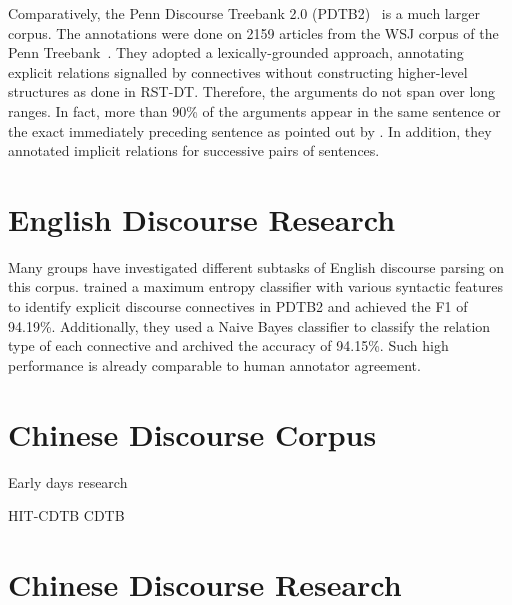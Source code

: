 

Comparatively, the Penn Discourse Treebank 2.0 (PDTB2)~\citep{Prasad08thepenn}
is a much larger corpus. The annotations were done on 2159 articles from
the WSJ corpus of the Penn Treebank~\citep{marcus1993building}. They adopted a lexically-grounded
approach, annotating explicit relations signalled by connectives without constructing higher-level
structures as done in RST-DT. Therefore, the arguments do not span over long ranges. In fact,
more than 90\% of the arguments appear in the same sentence or the exact immediately
preceding sentence as pointed out by \cite{kong2014a}. In addition, they annotated implicit relations
for successive pairs of sentences.


\section{English Discourse Research}

Many groups have investigated different subtasks of English
discourse parsing on this corpus. \cite{pitler2009using} trained a maximum
entropy classifier with various syntactic features to identify explicit discourse
connectives in PDTB2 and achieved the F1 of 94.19\%. Additionally, they used
a Naive Bayes classifier to classify the relation type of each connective and
archived the accuracy of 94.15\%. Such high performance is already comparable to human annotator agreement.



\section{Chinese Discourse Corpus}

Early days research

HIT-CDTB
CDTB

\section{Chinese Discourse Research}



